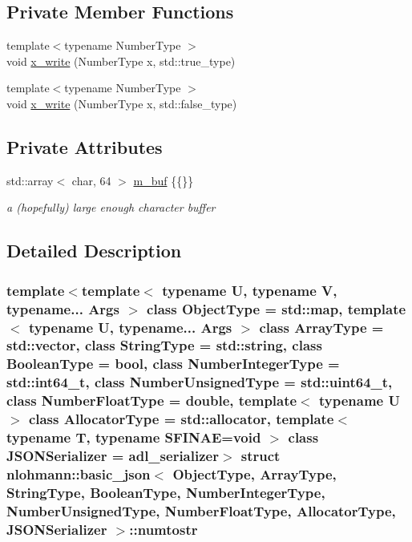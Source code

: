 \subsection*{Private Member Functions}
\begin{DoxyCompactItemize}
\item 
{\footnotesize template$<$typename Number\+Type $>$ }\\void \hyperlink{structnlohmann_1_1basic__json_1_1numtostr_aadc027c4daff6c4a9fd51a58ff16e53c}{x\+\_\+write} (Number\+Type x, std\+::true\+\_\+type)
\item 
{\footnotesize template$<$typename Number\+Type $>$ }\\void \hyperlink{structnlohmann_1_1basic__json_1_1numtostr_a91a7a5b4311422f1ad298245501a05d1}{x\+\_\+write} (Number\+Type x, std\+::false\+\_\+type)
\end{DoxyCompactItemize}
\subsection*{Private Attributes}
\begin{DoxyCompactItemize}
\item 
std\+::array$<$ char, 64 $>$ \hyperlink{structnlohmann_1_1basic__json_1_1numtostr_afc0e65fa9ade391900fdc658fa1c65ab}{m\+\_\+buf} \{\{\}\}
\begin{DoxyCompactList}\small\item\em a (hopefully) large enough character buffer \end{DoxyCompactList}\end{DoxyCompactItemize}


\subsection{Detailed Description}
\subsubsection*{template$<$template$<$ typename U, typename V, typename... Args $>$ class Object\+Type = std\+::map, template$<$ typename U, typename... Args $>$ class Array\+Type = std\+::vector, class String\+Type = std\+::string, class Boolean\+Type = bool, class Number\+Integer\+Type = std\+::int64\+\_\+t, class Number\+Unsigned\+Type = std\+::uint64\+\_\+t, class Number\+Float\+Type = double, template$<$ typename U $>$ class Allocator\+Type = std\+::allocator, template$<$ typename T, typename S\+F\+I\+N\+A\+E=void $>$ class J\+S\+O\+N\+Serializer = adl\+\_\+serializer$>$\newline
struct nlohmann\+::basic\+\_\+json$<$ Object\+Type, Array\+Type, String\+Type, Boolean\+Type, Number\+Integer\+Type, Number\+Unsigned\+Type, Number\+Float\+Type, Allocator\+Type, J\+S\+O\+N\+Serializer $>$\+::numtostr}

